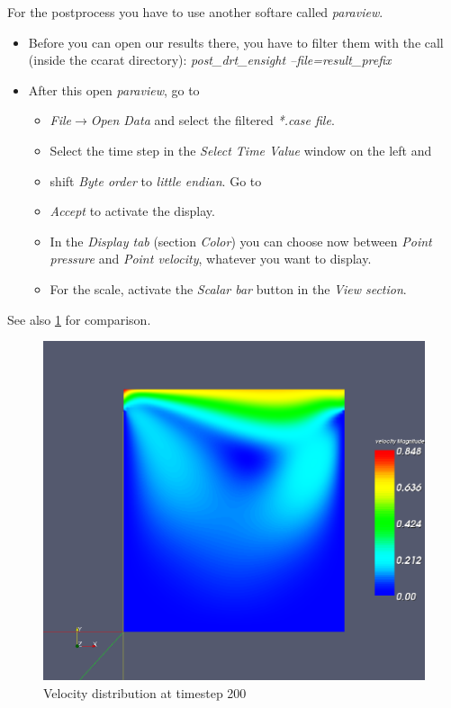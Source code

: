 For the postprocess you have to use another softare called \emph{paraview}. 

\begin{itemize}
\item Before you can open our results there, you have to filter them with
the call (inside the ccarat directory): \emph{post\_drt\_ensight --file=result\_prefix}
\item After this open \emph{paraview}, go to 

\begin{itemize}
\item \emph{File$\to$Open Data} and select the filtered \emph{{*}.case
file}. 
\item Select the time step in the \emph{Select Time Value} window on the
left and 
\item shift \emph{Byte order} to \emph{little endian}. Go to 
\item \emph{Accept} to activate the display.
\item In the \emph{Display tab} (section \emph{Color}) you can choose now
between \emph{Point pressure} and \emph{Point velocity}, whatever
you want to display.
\item For the scale, activate the \emph{Scalar bar} button in the \emph{View
section}. 
\end{itemize}
\end{itemize}
See also \ref{tut_fsi:4.2} for comparison.

%
\begin{figure}[h]
\includegraphics[scale=0.4]{Bilder/fluid_02}


\caption{\label{tut_fsi:4.2} Velocity distribution at timestep 200}
\end{figure}



